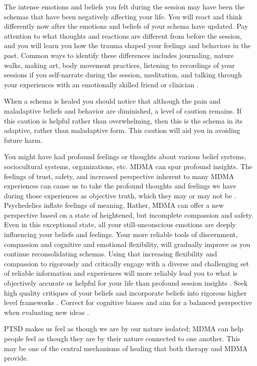 \documentclass[12pt,letterpaper]{book}
\begin{document}
The intense emotions and beliefs you felt during the session may have been the schemas that have been negatively affecting your life. You will react and think differently now after the emotions and beliefs of your schema have updated. Pay attention to what thoughts and reactions are different from before the session, and you will learn you how the trauma shaped your feelings and behaviors in the past. Common ways to identify these differences includes journaling, nature walks, making art, body movement practices, listening to recordings of your sessions if you self-narrate during the session, meditation, and talking through your experiences with an emotionally skilled friend or clinician \cite{mithoeferManual}.

When a schema is healed you should notice that although the pain and maladaptive beliefs and behavior are diminished, a level of caution remains. If this caution is helpful rather than overwhelming, then this is the schema in its adaptive, rather than maladaptive form. This caution will aid you in avoiding future harm.

You might have had profound feelings or thoughts about various belief systems, sociocultural systems, organizations, etc. MDMA can spur profound insights. The feelings of trust, safety, and increased perspective inherent to many MDMA experiences can cause us to take the profound thoughts and feelings we have during those experiences as objective truth, which they may or may not be \cite{hartogsohn2018meaning}. Psychedelics inflate feelings of meaning. Rather, MDMA can offer a new perspective based on a state of heightened, but incomplete compassion and safety. Even in this exceptional state, all your still-unconscious emotions are deeply influencing your beliefs and feelings. Your more reliable tools of discernment, compassion and cognitive and emotional flexibility, will gradually improve as you continue reconsolidating schemas. Using that increasing flexibility and compassion to rigorously and critically engage with a diverse and challenging set of reliable information and experiences will more reliably lead you to what is objectively accurate or helpful for your life than profound session insights \cite{bentzMindfulInquiry}. Seek high quality critiques of your beliefs and incorporate beliefs into rigorous higher level frameworks \cite{saganDemon}. Correct for cognitive biases and aim for a balanced perspective when evaluating new ideas \cite{galefScoutMindset}.

PTSD makes us feel as though we are by our nature isolated; MDMA can help people feel as though they are by their nature connected to one another. This may be one of the central mechanisms of healing that both therapy and MDMA provide.
\end{document}
